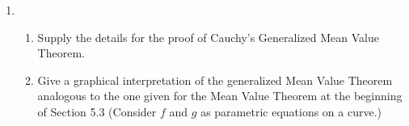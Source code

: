 \begin{enumerate}
\begin{proof}
\begin{enumerate}
    \item Since \( h \) is differentiable on \( [0,3] \) it follows that it is continuous there. So if
    \[
    g(x) = h(x) - x 
    \]
    Then \( g \) is also continuous on \( [0.3] \). We observe that
    \begin{align*}
        g(1) &= h(1) -1 \\
        &= 2-1 \\
        &= 1 \\
        \intertext{and}
        g(3) &= h(3) - 3 \\
        &= 2-3 \\
        &= -1
    \end{align*}
    So by the IVT, it follows that there exists \( d \in (a,b) \) such that \( g(d) = 0 \). Thus there exists \( d \in (0,3) \) such that \( h(d) - d = 0 \). That is \( h(d) = d \). Therefore, \( h \) has a fixed point in \( [0,3] \).
    
    \item By the MVT, we have that there exists \( c \in [0,3] \) such that
    \[
    h'(c) = \frac{h(3)-h(0)}{3-0} = \frac{2-1}{3} = \frac{1}{3}
    \]
    
    \item By the MVT, there exists \( c_1, c_2 \in (0,3) \) such that
    \begin{align*}
        f'(c_1) = &\frac{h(1)-h(0)}{1-0} = 1 \\
        f'(c_2) = &\frac{h(3)-h(1)}{3-1} = 0
    \end{align*}
    Since \( 0 < \frac{1}{4} < 1 \) we then have, by Darboux, that there exists \( c_3 \in (0,3) \) such that 
    \[
    f'(c_3) = \frac{1}{4}
    \]
\end{enumerate}
\end{proof}

\item \begin{enumerate}
    \item Supply the details for the proof of Cauchy's Generalized Mean Value Theorem.
    
    \item Give a graphical interpretation of the generalized Mean Value Theorem analogous to the one given for the Mean Value Theorem at the beginning of Section 5.3 (Consider \( f \) and \( g \) as parametric equations on a curve.)
\end{enumerate}


\end{enumerate}
